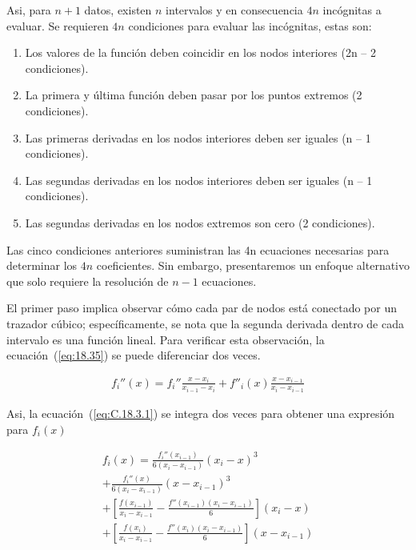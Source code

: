 \documentclass[conference]{IEEEtran}
\begin{document}
Asi, para $n + 1$ datos, existen $n$ intervalos y en consecuencia
$4n$ incógnitas a evaluar. Se requieren $4n$ condiciones para
evaluar las incógnitas, estas son:

\begin{enumerate}
	\item Los valores de la función deben coincidir en los nodos
	      interiores (2n – 2 condiciones).

	\item La primera y última función deben pasar por los puntos
	      extremos (2 condiciones).

	\item Las primeras derivadas en los nodos interiores deben ser
	      iguales (n – 1 condiciones).

	\item Las segundas derivadas en los nodos interiores deben ser
	      iguales (n – 1 condiciones).

	\item Las segundas derivadas en los nodos extremos
	      son cero (2 condiciones).
\end{enumerate}

Las cinco condiciones anteriores suministran las 4n ecuaciones necesarias
para determinar los $4n$ coeficientes. Sin embargo, presentaremos un enfoque
alternativo que solo requiere la resolución de $n - 1$ ecuaciones.

El primer paso implica
observar cómo cada par de nodos está conectado por un trazador cúbico;
específicamente, se nota que la segunda derivada dentro de cada intervalo
es una función lineal. Para verificar esta observación, la ecuación~(\ref{eq:18.35})
se puede diferenciar dos veces.

\begin{align}
	f_{i}''(x) = f_{i}'' \frac{x - x_{i}}{x_{i - 1} - x_{i}}
	+ f''_{i}(x) \frac{x - x_{i - 1}}{x_{i} - x_{i - 1}}
	\label{eq:C.18.3.1}
\end{align}

Asi, la ecuación~(\ref{eq:C.18.3.1}) se integra dos veces para obtener
una expresión para $f_{i}(x)$

\begin{multline}
	f_{i}(x) = \frac{f_{i}''(x_{i - 1})}{6 (x_{i} - x_{i - 1})} {(x_{i} - x)}^{3} \\
	+ \frac{f_{i}''(x)}{6 (x_{i} - x_{i - 1})} {(x - x_{i - 1})}^{3} \\
	+ [\frac{f(x_{i - 1})}{x_{i} - x_{i - 1}} - \frac{f''(x_{i - 1}) (x_{i} - x_{i - 1})}{6}] (x_{i} - x) \\
	+ [\frac{f(x_{i})}{x_{i} - x_{i - 1}} - \frac{f''(x_{i})(x_{i} - x_{i - 1})}{6}](x - x_{i - 1}) \\
	\label{eq:C.18.3.2}
\end{multline}
\end{document}
